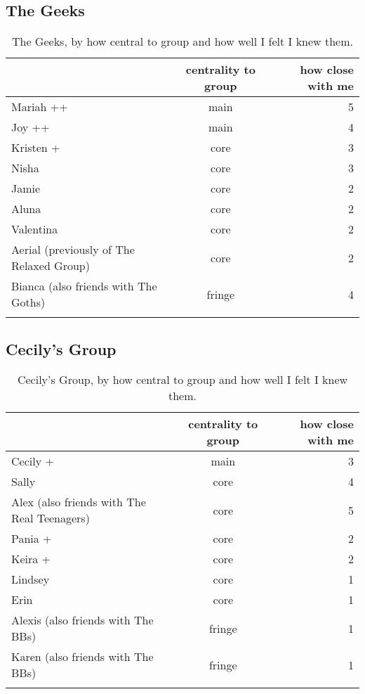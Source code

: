 \subsection{The Geeks}
\nopagebreak
\begin{table}[ht]
\caption{The Geeks, by how central to group and how well I felt I knew them.}\label{append:Geeks}
	\centering
		\begin{tabular}{p{3.5cm}cr} \\
		\lsptoprule
			\multirow{2}{*}{\sc name} & \multicolumn{1}{p{2cm}}{\centering \sc centrality to group} & \multicolumn{1}{p{1.75cm}}{\centering \sc how close with me}  \\
		\midrule
Mariah ++ & main & 5 \\\hline
Joy ++   & main & 4 \\\hline
Kristen + & core & 3 \\\hline
Nisha  &  core  &  3 \\\hline
Jamie  & core & 2 \\\hline
Aluna & core & 2 \\\hline
Valentina & core & 2 \\\hline
Aerial (previously of The Relaxed Group) & core & 2 \\\hline
Bianca (also friends with The Goths) & fringe & 4 \\
   \lspbottomrule
				\end{tabular}
\end{table}


\subsection{Cecily's Group}
\begin{table}[H]
\caption{Cecily's Group, by how central to group and how well I felt I knew them.}\label{append:Cecily}
	\centering
		\begin{tabular}{p{3.5cm}cr} \\
		\lsptoprule
			\multirow{2}{*}{\sc name} & \multicolumn{1}{p{2cm}}{\centering \sc centrality to group} & \multicolumn{1}{p{1.75cm}}{\centering \sc how close with me}  \\
		\midrule
Cecily + & main & 3 \\\hline
Sally & core & 4 \\\hline
Alex (also friends with The Real Teenagers) & core & 5 \\\hline
Pania + & core & 2 \\\hline
Keira + & core & 2 \\\hline
Lindsey & core & 1 \\\hline
Erin & core & 1 \\\hline
Alexis (also friends with The BBs) & fringe & 1 \\\hline
Karen (also friends with The BBs) & fringe & 1 \\
   \lspbottomrule
				\end{tabular}
\end{table}

